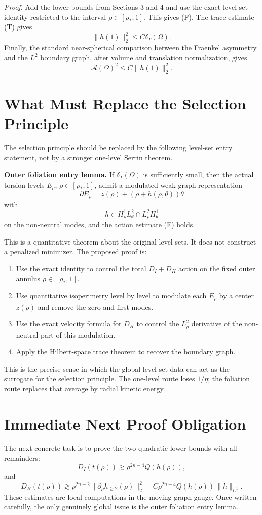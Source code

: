 \documentclass[11pt]{article}
\begin{document}
\emph{Proof.}
Add the lower bounds from Sections 3 and 4 and use the exact level-set identity
restricted to the interval \(\rho\in[\rho_*,1]\). This gives (F). The trace
estimate (T) gives
\[
\|h(1)\|_2^2\le C\delta_T(\Omega).
\]
Finally, the standard near-spherical comparison between the Fraenkel asymmetry
and the \(L^2\) boundary graph, after volume and translation normalization,
gives
\[
\mathcal A(\Omega)^2\le C\|h(1)\|_2^2.
\]

\section{What Must Replace the Selection Principle}

The selection principle should be replaced by the following level-set entry
statement, not by a stronger one-level Serrin theorem.

\textbf{Outer foliation entry lemma.}
If \(\delta_T(\Omega)\) is sufficiently small, then the actual torsion levels
\(E_\rho\), \(\rho\in[\rho_*,1]\), admit a modulated weak graph representation
\[
\partial E_\rho
=
z(\rho)+(\rho+h(\rho,\theta))\theta
\]
with
\[
h\in H^1_\rho L^2_\theta\cap L^2_\rho H^1_\theta
\]
on the non-neutral modes, and the action estimate (F) holds.

This is a quantitative theorem about the original level sets. It does not
construct a penalized minimizer. The proposed proof is:
\begin{enumerate}
\item Use the exact identity to control the total \(D_I+D_H\) action on the
fixed outer annulus \(\rho\in[\rho_*,1]\).
\item Use quantitative isoperimetry level by level to modulate each \(E_\rho\)
by a center \(z(\rho)\) and remove the zero and first modes.
\item Use the exact velocity formula for \(D_H\) to control the \(L^2_\rho\)
derivative of the non-neutral part of this modulation.
\item Apply the Hilbert-space trace theorem to recover the boundary graph.
\end{enumerate}

This is the precise sense in which the global level-set data can act as the
surrogate for the selection principle. The one-level route loses \(1/\eta\);
the foliation route replaces that average by radial kinetic energy.

\section{Immediate Next Proof Obligation}

The next concrete task is to prove the two quadratic lower bounds with all
remainders:
\[
D_I(t(\rho))
\gtrsim
\rho^{2n-4}Q(h(\rho)),
\]
and
\[
D_H(t(\rho))
\gtrsim
\rho^{2n-2}
\|\partial_\rho h_{\ge2}(\rho)\|_2^2
-C\rho^{2n-4}Q(h(\rho))\,\|h\|_{C^1}.
\]
These estimates are local computations in the moving graph gauge. Once written
carefully, the only genuinely global issue is the outer foliation entry lemma.
\end{document}
